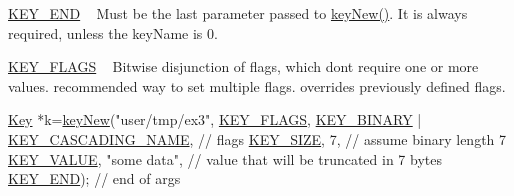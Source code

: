 \begin{DoxyItemize}
\item \hyperlink{group__key_gga91fb3178848bd682000958089abbaf40aa8adb6fcb92dec58fb19410eacfdd403}{K\+E\+Y\+\_\+\+E\+ND} ~\newline
 Must be the last parameter passed to \hyperlink{group__key_gad23c65b44bf48d773759e1f9a4d43b89}{key\+New()}. It is always required, unless the {\ttfamily key\+Name} is 0.
\item \hyperlink{group__key_gga91fb3178848bd682000958089abbaf40a4b83f86a07a7a0d6e24ecafe43cfea1b}{K\+E\+Y\+\_\+\+F\+L\+A\+GS} ~\newline
 Bitwise disjunction of flags, which don\textquotesingle{}t require one or more values. recommended way to set multiple flags. overrides previously defined flags. 
\begin{DoxyCodeInclude}
\hyperlink{classkdb_1_1Key_a5679f5cae63caddd64a60388b9cc77fa}{Key} *k=\hyperlink{group__key_gad23c65b44bf48d773759e1f9a4d43b89}{keyNew}(\textcolor{stringliteral}{"user/tmp/ex3"},
        \hyperlink{group__key_gga91fb3178848bd682000958089abbaf40a4b83f86a07a7a0d6e24ecafe43cfea1b}{KEY\_FLAGS}, \hyperlink{group__key_gga91fb3178848bd682000958089abbaf40a1ca18d4e094ae7487d35ecedda2235ff}{KEY\_BINARY} | \hyperlink{group__key_gga91fb3178848bd682000958089abbaf40afc1567f74444ff9c219f7456b652b4ec}{KEY\_CASCADING\_NAME}, \textcolor{comment}{// flags}
        \hyperlink{group__key_gga91fb3178848bd682000958089abbaf40a6d531b5c41445d19d0452eebdccbfa01}{KEY\_SIZE}, 7,                    \textcolor{comment}{// assume binary length 7}
        \hyperlink{group__key_gga91fb3178848bd682000958089abbaf40ac66e4a49d09212b79f5754ca6db5bd2e}{KEY\_VALUE}, \textcolor{stringliteral}{"some data"},                \textcolor{comment}{// value that will be truncated in 7 bytes}
        \hyperlink{group__key_gga91fb3178848bd682000958089abbaf40aa8adb6fcb92dec58fb19410eacfdd403}{KEY\_END});                        \textcolor{comment}{// end of args}
\end{DoxyCodeInclude}


\end{DoxyItemize}
